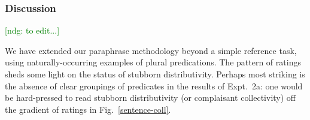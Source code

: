 \documentclass[linguex]{sp}
\newcommand{\ndg}[1]{\textcolor{Green}{[ndg: #1]}}
\begin{document}
\subsubsection{Discussion}

\ndg{to edit...}

We have extended our paraphrase methodology beyond a simple reference task, using naturally-occurring examples of plural predications.
The pattern of ratings sheds some light on the status of stubborn distributivity. Perhaps most striking is the absence of clear groupings of predicates in the results of Expt.~2a: one would be hard-pressed to read stubborn distributivity (or complaisant collectivity) off the gradient of ratings in Fig.~\ref{sentence-coll}.


\end{document}
